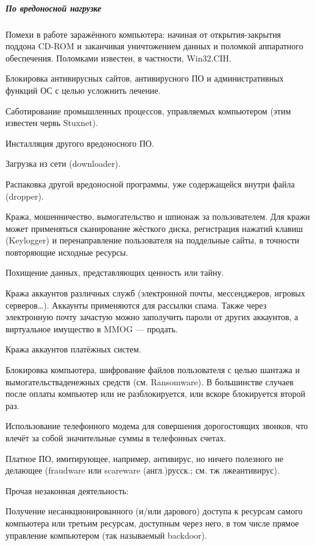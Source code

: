 \subparagraph{По вредоносной нагрузке}
%
\begin{Notes}
  \item Помехи в работе заражённого компьютера: начиная от открытия-закрытия поддона CD-ROM и заканчивая уничтожением данных и поломкой аппаратного обеспечения. Поломками известен, в частности, Win32.CIH.   \item Блокировка антивирусных сайтов, антивирусного ПО и административных функций ОС с целью усложнить лечение.
  \item Саботирование промышленных процессов, управляемых компьютером (этим известен червь Stuxnet).
  \item Инсталляция другого вредоносного ПО.   \item Загрузка из сети (downloader).
  \item Распаковка другой вредоносной программы, уже содержащейся внутри файла (dropper).
  \item Кража, мошенничество, вымогательство и шпионаж за пользователем. Для кражи может применяться сканирование жёсткого диска, регистрация нажатий клавиш (Keylogger) и перенаправление пользователя на поддельные сайты, в точности повторяющие исходные ресурсы.   \item Похищение данных, представляющих ценность или тайну.
  \item Кража аккаунтов различных служб (электронной почты, мессенджеров, игровых серверов…). Аккаунты применяются для рассылки спама. Также через электронную почту зачастую можно заполучить пароли от других аккаунтов, а виртуальное имущество в MMOG — продать.
  \item Кража аккаунтов платёжных систем.
  \item Блокировка компьютера, шифрование файлов пользователя с целью шантажа и вымогательстваденежных средств (см. Ransomware). В большинстве случаев после оплаты компьютер или не разблокируется, или вскоре блокируется второй раз.
  \item Использование телефонного модема для совершения дорогостоящих звонков, что влечёт за собой значительные суммы в телефонных счетах.
  \item Платное ПО, имитирующее, например, антивирус, но ничего полезного не делающее (fraudware или scareware (англ.)русск.; см. тж лжеантивирус).
  \item Прочая незаконная деятельность:
  \item Получение несанкционированного (и/или дарового) доступа к ресурсам самого компьютера или третьим ресурсам, доступным через него, в том числе прямое управление компьютером (так называемый backdoor).

\end{Notes}
